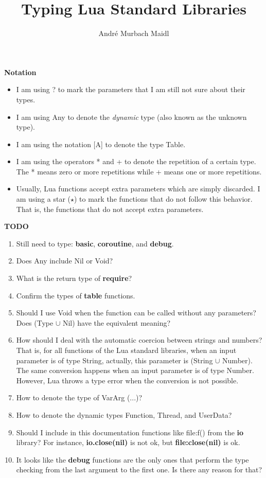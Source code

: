 \documentclass[12pt]{article}
\title{Typing Lua Standard Libraries}
\author{André Murbach Maidl}
\begin{document}
\maketitle

\textbf{Notation}

\begin{itemize}
\item I am using ? to mark the parameters that I am still not
sure about their types.
\item I am using Any to denote the \textit{dynamic} type
(also known as the unknown type).
\item I am using the notation [A] to denote the type Table.
\item I am using the operators * and + to denote the repetition
of a certain type. The * means zero or more repetitions while +
means one or more repetitions.
\item Usually, Lua functions accept extra parameters which are
simply discarded.
I am using a star ($\star$) to mark the functions that do not
follow this behavior.
That is, the functions that do not accept extra parameters.
\end{itemize}

\newpage

\textbf{TODO}

\begin{enumerate}
\item Still need to type: \textbf{basic}, \textbf{coroutine},
and \textbf{debug}.
\item Does Any include Nil or Void?
\item What is the return type of \textbf{require}?
\item Confirm the types of \textbf{table} functions.
\item Should I use Void when the function can be called without any
parameters? Does (Type $\cup$ Nil) have the equivalent meaning?
\item How should I deal with the automatic coercion between
strings and numbers?
That is, for all functions of the Lua standard libraries,
when an input parameter is of type String, actually, this
parameter is (String $\cup$ Number).
The same conversion happens when an input parameter is of type
Number.
However, Lua throws a type error when the conversion is not
possible.
\item How to denote the type of VarArg (...)?
\item How to denote the dynamic types Function, Thread, and UserData?
\item Should I include in this documentation functions like
file:f() from the \textbf{io} library?
For instance, \textbf{io.close(nil)} is not ok, but
\textbf{file:close(nil)} is ok.
\item It looks like the \textbf{debug} functions are the only ones
that perform the type checking from the last argument to the first
one.
Is there any reason for that?
\end{enumerate}
\end{document}
